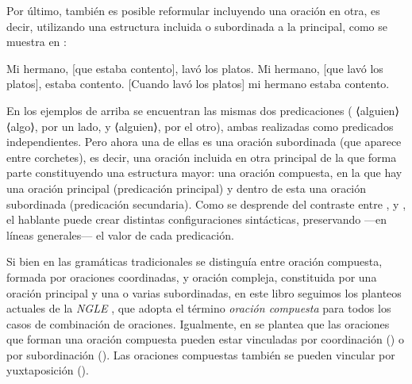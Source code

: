 Por último, también es posible reformular  incluyendo una
oración en otra, es decir, utilizando una estructura incluida o subordinada a la
principal, como se muestra en :

\begin{exe}
  \ex\label{ex:12-hermano5}
    \begin{xlist}
      \ex\label{ex:12-hermano5-a} Mi hermano, [que estaba contento], lavó los
          platos.
      \ex\label{ex:12-hermano5-b} Mi hermano, [que lavó los platos], estaba
          contento.
      \ex\label{ex:12-hermano5-c} [Cuando lavó los platos] mi hermano estaba
          contento.
    \end{xlist}
\end{exe}

En los ejemplos de arriba se encuentran las mismas dos predicaciones
( ⟨alguien⟩ ⟨algo⟩, por un lado, y 
⟨alguien⟩, por el otro), ambas realizadas como predicados independientes. Pero
ahora una de ellas es una oración subordinada (que aparece entre corchetes), es
decir, una oración incluida en otra principal de la que forma parte
constituyendo una estructura mayor: una oración compuesta, en la que hay una
oración principal (predicación principal) y dentro de esta una oración
subordinada (predicación secundaria). Como se desprende del contraste entre
,  y ,
el hablante puede crear distintas configuraciones sintácticas, preservando ---en
líneas generales--- el valor de cada predicación.

\begin{recuadro}
Si bien en las gramáticas tradicionales se distinguía entre oración compuesta,
formada por oraciones coordinadas, y oración compleja, constituida por una
oración principal y una o varias subordinadas, en este libro seguimos los
planteos actuales de la \textit{NGLE} \parencite[§\,1.13ñ]{rae2025}, que adopta el
término \textit{oración compuesta} para todos los casos de combinación de
oraciones. Igualmente, en \textcite{bosque2019} se plantea que las oraciones que
forman una oración compuesta pueden estar vinculadas por coordinación
() o por subordinación (). Las oraciones compuestas también se pueden vincular
por yuxtaposición ().
\end{recuadro}

